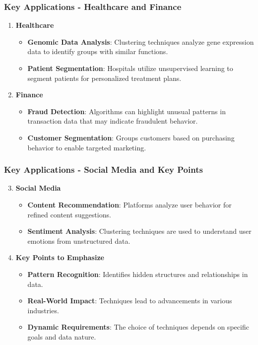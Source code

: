 \documentclass[aspectratio=169]{beamer}
\begin{document}
\begin{frame}[fragile]
    \frametitle{Key Applications - Healthcare and Finance}
    \begin{enumerate}
        \item \textbf{Healthcare}
        \begin{itemize}
            \item \textbf{Genomic Data Analysis}: Clustering techniques analyze gene expression data to identify groups with similar functions.
            \item \textbf{Patient Segmentation}: Hospitals utilize unsupervised learning to segment patients for personalized treatment plans.
        \end{itemize}
        \pause
        \item \textbf{Finance}
        \begin{itemize}
            \item \textbf{Fraud Detection}: Algorithms can highlight unusual patterns in transaction data that may indicate fraudulent behavior.
            \item \textbf{Customer Segmentation}: Groups customers based on purchasing behavior to enable targeted marketing.
        \end{itemize}
    \end{enumerate}
\end{frame}

\begin{frame}[fragile]
    \frametitle{Key Applications - Social Media and Key Points}
    \begin{enumerate}
        \setcounter{enumi}{2}
        \item \textbf{Social Media}
        \begin{itemize}
            \item \textbf{Content Recommendation}: Platforms analyze user behavior for refined content suggestions.
            \item \textbf{Sentiment Analysis}: Clustering techniques are used to understand user emotions from unstructured data.
        \end{itemize}
        \item \textbf{Key Points to Emphasize}
        \begin{itemize}
            \item \textbf{Pattern Recognition}: Identifies hidden structures and relationships in data.
            \item \textbf{Real-World Impact}: Techniques lead to advancements in various industries.
            \item \textbf{Dynamic Requirements}: The choice of techniques depends on specific goals and data nature.
        \end{itemize}
    \end{enumerate}
\end{frame}
\end{document}

